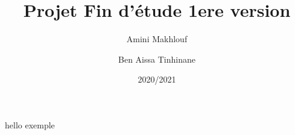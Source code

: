 \documentclass[11pt]{report}
\title{Projet Fin d'étude 1ere version}
\author{Amini Makhlouf \and Ben Aissa Tinhinane}
\date{2020/2021}
\begin{document}
    \maketitle
    \tableofcontents
    \listoffigures
    
    hello exemple \cite{marcia2017smart}
    
    
  
  
    
\end{document}
